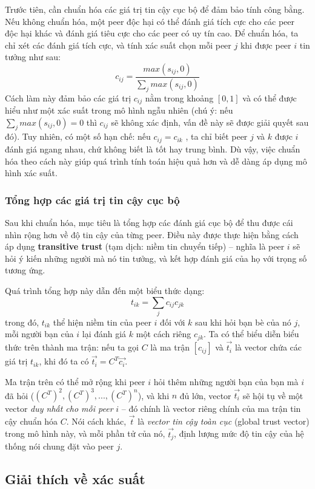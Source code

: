 Trước tiên, cần chuẩn hóa các giá trị tin cậy cục bộ để đảm bảo tính công bằng. Nếu không chuẩn hóa, một peer độc hại có thể đánh giá tích cực cho các peer độc hại khác và
đánh giá tiêu cực cho các peer có uy tín cao. Để chuẩn hóa, ta chỉ xét các đánh giá tích cực, và tính xác suất chọn mỗi peer $j$ khi được peer $i$ tin tưởng như sau:
\[c_{ij} = \frac{max(s_{ij}, 0)}{\sum_{j} max(s_{ij}, 0)}\]
Cách làm này đảm bảo các giá trị $c_{ij}$ nằm trong khoảng $[0, 1]$ và có thể được hiểu như một xác suất trong mô hình ngẫu nhiên
(chú ý: nếu $\sum_{j} max(s_{ij}, 0) = 0$ thì $c_{ij}$ sẽ không xác định, vấn đề này sẽ được giải quyết sau đó).
Tuy nhiên, có một số hạn chế: nếu $c_{ij} = c_{ik}$ , ta chỉ biết peer $j$ và $k$ được $i$ đánh giá ngang nhau, chứ không biết là tốt hay trung bình.
Dù vậy, việc chuẩn hóa theo cách này giúp quá trình tính toán hiệu quả hơn và dễ dàng áp dụng mô hình xác suất.

\subsubsection{Tổng hợp các giá trị tin cậy cục bộ}

Sau khi chuẩn hóa, mục tiêu là tổng hợp các đánh giá cục bộ để thu được cái nhìn rộng hơn về độ tin cậy của từng peer.
Điều này được thực hiện bằng cách áp dụng \textbf{transitive trust} (tạm dịch: niềm tin chuyển tiếp)
-- nghĩa là peer $i$ sẽ hỏi ý kiến những người mà nó tin tưởng, và kết hợp đánh giá của họ với trọng số tương ứng.

Quá trình tổng hợp này dẫn đến một biểu thức dạng:
\[t_{ik} = \sum_{j} c_{ij}c_{jk}\]
trong đó, $t_{ik}$ thể hiện niềm tin của peer $i$ đối với $k$ sau khi hỏi bạn bè của nó $j$, mỗi người bạn của $i$ lại đánh giá $k$ một cách riêng $c_{jk}$.
Ta có thể biểu diễn biểu thức trên thành ma trận: nếu ta gọi $C$ là ma trận $[c_{ij}]$ và $\vec{t_i}$ là vector chứa các giá trị $t_{ik}$, khi đó ta có
$\vec{t_i} = C^{T}\vec{c_i}$.

Ma trận trên có thể mở rộng khi peer $i$ hỏi thêm những người bạn của bạn mà $i$ đã hỏi ($(C^T)^2, (C^T)^3, ..., (C^T)^n$), và khi $n$ đủ lớn, vector $\vec{t_i}$ sẽ hội tụ về một vector
\textit{duy nhất cho mỗi peer} $i$ -- đó chính là vector riêng chính của ma trận tin cậy chuẩn hóa $C$. Nói cách khác, $\vec{t}$ là \textit{vector tin cậy toàn cục} (global trust vector) trong mô hình này,
và mỗi phần tử của nó, $\vec{t_j}$, định lượng mức độ tin cậy của hệ thống nói chung đặt vào peer $j$.

\subsection{Giải thích về xác suất}


